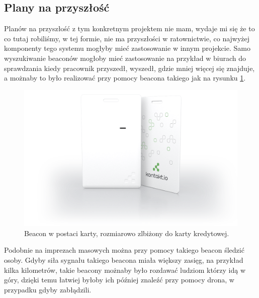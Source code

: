 \subsection{Plany na przyszłość}

Planów na przyszłość z tym konkretnym projektem nie mam, wydaje mi się że to co tutaj robiliśmy, w tej formie, nie ma przyszłości w ratownictwie, co najwyżej komponenty tego systemu mogłyby mieć zastosowanie w innym projekcie. Samo wyszukiwanie beaconów mogłoby mieć zastosowanie na przykład w biurach do sprawdzania kiedy pracownik przyszedł, wyszedł, gdzie mniej więcej się znajduje, a możnaby to było realizować przy pomocy beacona takiego jak na rysunku \ref{fig:beaconcard}.

\begin{figure}[!th]
    \centering
    \includegraphics[width=15cm]{zalaczniki/obrazy/beacon_card.png}
    \caption{Beacon w postaci karty, rozmiarowo zlbiżony do karty kredytowej.}
    \label{fig:beaconcard}
\end{figure}

Podobnie na imprezach masowych można przy pomocy takiego beacon śledzić osoby. Gdyby siła sygnału takiego beacona miała większy zasięg, na przykład kilka kilometrów, takie beacony możnaby było rozdawać ludziom którzy idą w góry, dzięki temu łatwiej byłoby ich później znaleźć przy pomocy drona, w przypadku gdyby zabłądzili.


